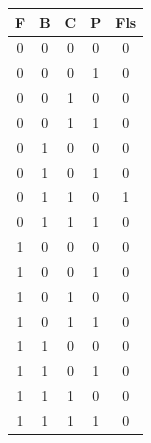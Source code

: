 \documentclass{article}
\begin{document}
		\begin{tabular}{|c|c|c|c|c|}
			\hline
			\textbf{ F } & \textbf{ B } & \textbf{ C } & \textbf{ P } & \textbf{ Fls }\\
			\hline
			0 & 0 & 0 & 0 & 0 \\%
			\hline
			0 & 0 & 0 & 1 & 0 \\%
			\hline
			0 & 0 & 1 & 0 & 0 \\%
			\hline
			0 & 0 & 1 & 1 & 0 \\%
			\hline
			0 & 1 & 0 & 0 & 0 \\%
			\hline
			0 & 1 & 0 & 1 & 0 \\%
			\hline
			0 & 1 & 1 & 0 & 1 \\%
			\hline
			0 & 1 & 1 & 1 & 0 \\%
			\hline
			1 & 0 & 0 & 0 & 0 \\%
			\hline
			1 & 0 & 0 & 1 & 0 \\%
			\hline
			1 & 0 & 1 & 0 & 0 \\%
			\hline
			1 & 0 & 1 & 1 & 0 \\%
			\hline
			1 & 1 & 0 & 0 & 0 \\%
			\hline
			1 & 1 & 0 & 1 & 0 \\%
			\hline
			1 & 1 & 1 & 0 & 0 \\%
			\hline
			1 & 1 & 1 & 1 & 0 \\%
			\hline
		\end{tabular}
		\pagebreak
\end{document}
